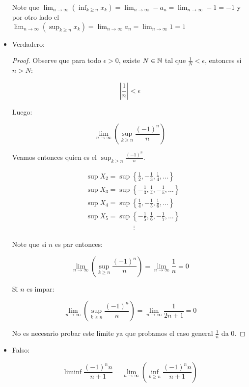 \begin{itemize}[label={✎},leftmargin=*]
    Note que $\lim_{n \to \infty} \left( \inf_{k\geq n} x_k \right)=\lim_{n \to \infty} -a_n=\lim_{n \to \infty} -1=-1$ y por otro lado el \\
    $\lim_{n \to \infty} \left( \sup_{k\geq n} x_k\right)=\lim_{n \to \infty} a_n=\lim_{n \to \infty} 1=1$

    \item Verdadero:\\ \begin{proof} 
    Observe que para todo $\epsilon>0$, existe $N\in \mathbb{N}$ tal que $\frac{1}{N}<\epsilon$, entonces si $n>N$:


    $$\left| \frac{1}{n} \right|<\epsilon$$

    Luego:

    $$\lim _{n \rightarrow \infty}\left(\sup _{k \geq n} \frac{(-1)^n}{n}\right)$$

    Veamos entonces quien es el $\sup_{k\geq n}\frac{(-1)^n}{n}$.

    \begin{align*}
        &\sup X_2=\sup \left\{\frac{1}{2},-\frac{1}{3},\frac{1}{4},\ldots\right\}\\
        &\sup X_3=\sup\left\{-\frac{1}{3},\frac{1}{4},-\frac{1}{5},\ldots\right\}\\
        &\sup X_4=\sup\left\{\frac{1}{4},-\frac{1}{5},\frac{1}{6},\ldots\right\}\\
        &\sup X_5=\sup\left\{-\frac{1}{5},\frac{1}{6},-\frac{1}{7},\ldots\right\}\\
        & \mathrel{\phantom{=askldfjaddsl}}\vdots
    \end{align*}

    Note que si $n$ es par entonces:

    $$\lim _{n \rightarrow \infty}\left(\sup_{k \geq n} \frac{(-1)^n}{n}\right)=\lim_{n \to \infty} \frac{1}{n}=0$$

    Si $n$ es impar:

    $$\lim _{n \rightarrow \infty}\left(\sup _{k \geq n} \frac{(-1)^n}{n}\right)=\lim_{n \to \infty} \frac{1}{2n+1}=0$$
    
    No es necesario probar este límite ya que probamos el caso general $\frac{1}{n}$ da 0.

    \end{proof} 


    \item Falso: 

        $$\liminf \frac{(-1)^n n}{n+1}=\lim _{n \rightarrow \infty}\left(\inf_{k \geq n} \frac{(-1)^nn}{n+1}\right)$$


\end{itemize}
